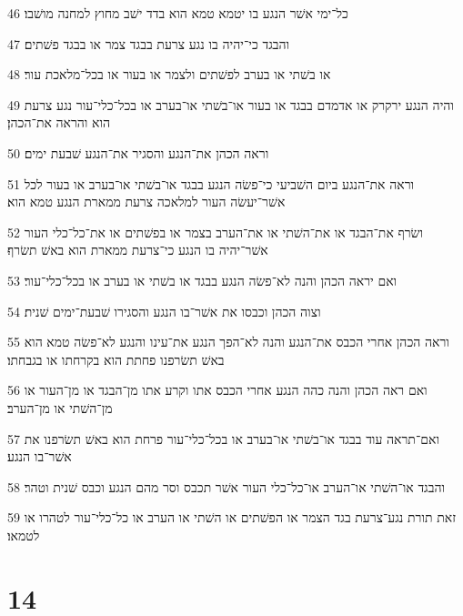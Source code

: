 \par 46 כל־ימי אשׁר הנגע בו יטמא טמא הוא בדד ישׁב מחוץ למחנה מושׁבו׃
\par 47 והבגד כי־יהיה בו נגע צרעת בבגד צמר או בבגד פשׁתים׃
\par 48 או בשׁתי או בערב לפשׁתים ולצמר או בעור או בכל־מלאכת עור׃
\par 49 והיה הנגע ירקרק או אדמדם בבגד או בעור או־בשׁתי או־בערב או בכל־כלי־עור נגע צרעת הוא והראה את־הכהן׃
\par 50 וראה הכהן את־הנגע והסגיר את־הנגע שׁבעת ימים׃
\par 51 וראה את־הנגע ביום השׁביעי כי־פשׂה הנגע בבגד או־בשׁתי או־בערב או בעור לכל אשׁר־יעשׂה העור למלאכה צרעת ממארת הנגע טמא הוא׃
\par 52 ושׂרף את־הבגד או את־השׁתי או את־הערב בצמר או בפשׁתים או את־כל־כלי העור אשׁר־יהיה בו הנגע כי־צרעת ממארת הוא באשׁ תשׂרף׃
\par 53 ואם יראה הכהן והנה לא־פשׂה הנגע בבגד או בשׁתי או בערב או בכל־כלי־עור׃
\par 54 וצוה הכהן וכבסו את אשׁר־בו הנגע והסגירו שׁבעת־ימים שׁנית׃
\par 55 וראה הכהן אחרי הכבס את־הנגע והנה לא־הפך הנגע את־עינו והנגע לא־פשׂה טמא הוא באשׁ תשׂרפנו פחתת הוא בקרחתו או בגבחתו׃
\par 56 ואם ראה הכהן והנה כהה הנגע אחרי הכבס אתו וקרע אתו מן־הבגד או מן־העור או מן־השׁתי או מן־הערב׃
\par 57 ואם־תראה עוד בבגד או־בשׁתי או־בערב או בכל־כלי־עור פרחת הוא באשׁ תשׂרפנו את אשׁר־בו הנגע׃
\par 58 והבגד או־השׁתי או־הערב או־כל־כלי העור אשׁר תכבס וסר מהם הנגע וכבס שׁנית וטהר׃
\par 59 זאת תורת נגע־צרעת בגד הצמר או הפשׁתים או השׁתי או הערב או כל־כלי־עור לטהרו או לטמאו׃

\chapter{14}

